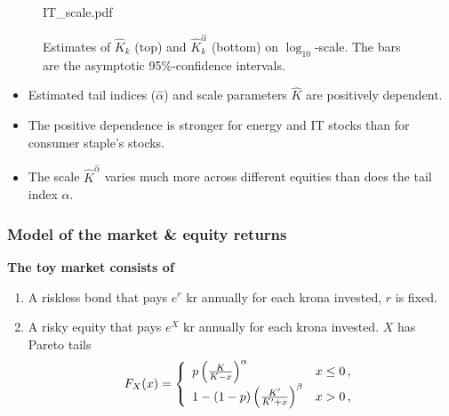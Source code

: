 \documentclass{beamer}
\begin{document}
\begin{frame}
\begin{minipage}{0.65\linewidth}
\begin{figure}[htb!]
\begin{minipage}{0.33\linewidth}
    {IT_scale.pdf}
  \end{minipage}
    \caption{\scriptsize Estimates of $\hat K_k$ (top) and
      $\hat K_k^{\hat \alpha}$ (bottom) on $\log_{10}$-scale.
      The bars are the asymptotic 95\%-confidence intervals.
    }
    \label{fig:sectors_parameters}
  \end{figure}
  \end{minipage}\hfill
  \begin{minipage}{0.35\linewidth}
    \begin{footnotesize}
      \begin{itemize}
      \item Estimated tail indices ($\hat \alpha$) and scale parameters
        $\hat K$ are positively dependent.
      \item The positive dependence is stronger for energy and IT stocks
        than for consumer staple's stocks.
      \item The scale $\hat K^{\hat \alpha}$ varies much more across different
        equities than does the tail index $\alpha$.
      \end{itemize}
    \end{footnotesize}
  \end{minipage}
\end{frame}

\begin{frame}
  \frametitle{Model of the market \& equity returns}
  \textcolor[HTML]{990033}{\bf The toy market consists of}
  \begin{enumerate}
  \item A riskless bond that pays $e^r$ kr annually for each krona invested,
    $r$ is fixed.
  \item A risky equity that pays $e^X$ kr annually for each krona invested.
    $X$ has Pareto tails
    \[
    F_X(x) = \left\{
      \begin{array}{ll}
        p \left(
          {K \over K - x}
        \right)^\alpha & x \leq 0 \,,\\
        1 - (1 - p) \left(
          {K' \over K' + x}
        \right)^\beta & x > 0\,,
      \end{array}
    \right.
    \]
  \end{enumerate}
\end{frame}
\end{document}
